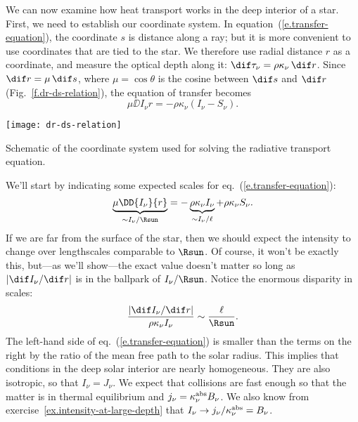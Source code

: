 We can now examine how heat transport works in the deep interior of a star. First, we need to establish our coordinate system. In equation~(\ref{e.transfer-equation}), the coordinate $s$ is distance along a ray; but it is more convenient to use coordinates that are tied to the star. We therefore use radial distance $r$ as a coordinate, and measure the optical depth along it: $\dif\tau_{\nu} = \rho\kappa_{\nu}\,\dif r$. 
Since $\dif r = \mu\,\dif s$, where $\mu=\cos\theta$ is the cosine between $\dif s$ and $\dif r$ (Fig.~\ref{f.dr-ds-relation}), the equation of transfer becomes
\begin{equation}
\mu\DD{I_{\nu}}{r} = -\rho\kappa_{\nu}\left(I_{\nu} - S_{\nu}\right).
\end{equation}
\begin{marginfigure}
\texttt{[image: dr-ds-relation]}
\caption[Coordinates for radiative transport equation]{\label{f.dr-ds-relation} Schematic of the coordinate system used for solving the radiative transport equation.}
\end{marginfigure}

 We'll start by indicating some expected scales for eq.~(\ref{e.transfer-equation}):
\[
\underbrace{\mu\DD{I_{\nu}}{r}}_{\sim I_{\nu}/\Rsun} = -\underbrace{\rho\kappa_{\nu} I_{\nu}}_{\sim I_{\nu}/\ell}  +\rho\kappa_{\nu} S_{\nu}.
\]
If we are far from the surface of the star, then we should expect the intensity to change over lengthscales comparable to $\Rsun$. Of course, it won't be exactly this, but---as we'll show---the exact value doesn't matter so long as $|\dif I_{\nu}/\dif r|$ is in the ballpark of $I_{\nu}/\Rsun$. Notice the enormous disparity in scales:
\[
	\frac{|\dif I_{\nu}/\dif r|}{\rho\kappa_{\nu}I_{\nu}} \sim \frac{\ell}{\Rsun}.
\]
The left-hand side of eq.~(\ref{e.transfer-equation}) is smaller than the terms on the right by the ratio of the mean free path to the solar radius. This implies that conditions in the deep solar interior are nearly homogeneous. They are also isotropic, so that $I_{\nu} = J_{\nu}$. We expect that collisions are fast enough so that the matter is in thermal equilibrium and $j_{\nu} = \kappa_\nu^{\mathrm{abs}} B_{\nu}$. We also know from exercise~\ref{ex.intensity-at-large-depth} that $I_{\nu} \to j_{\nu}/\kappa_\nu^{\mathrm{abs}} = B_{\nu}$.

